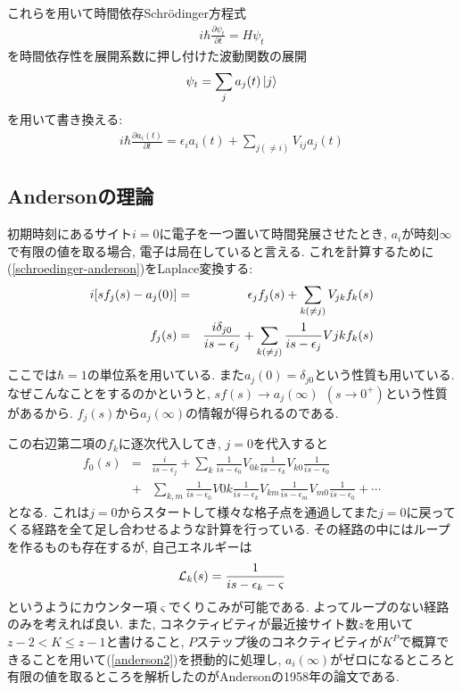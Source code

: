 \documentclass[10.5pt,a4paper]{jreport}
\begin{document}
これらを用いて時間依存Schr\"odinger方程式
\begin{eqnarray}
  i\hbar\frac{\partial \psi_t}{\partial t} = H\psi_t
\end{eqnarray}
を時間依存性を展開系数に押し付けた波動関数の展開
\begin{eqnarray}
  \psi_t = \sum_j a_j(t)\ket{j}
\end{eqnarray}
を用いて書き換える:
\begin{eqnarray}
  i\hbar\frac{\partial a_i(t)}{\partial t} = \epsilon_ia_i(t) + \sum_{j(\neq i)}V_{ij}a_j(t)\label{schroedinger-anderson}
\end{eqnarray}
\subsection{Andersonの理論}
初期時刻にあるサイト$i=0$に電子を一つ置いて時間発展させたとき, $a_i$が時刻$\infty$で有限の値を取る場合, 電子は局在していると言える. これを計算するために(\ref{schroedinger-anderson})をLaplace変換する:
\begin{eqnarray}
  i\qty[sf_j(s) - a_j(0)] &=& \epsilon_jf_j(s) + \sum_{k(\neq j)}V_{jk}f_k(s)\\
  f_j(s) &=& \frac{i\delta_{j0}}{is - \epsilon_j} + \sum_{k(\neq j)}\frac{1}{is - \epsilon_j}V{jk}f_k(s)
\end{eqnarray}
ここでは$\hbar = 1$の単位系を用いている. また$a_j(0) = \delta_{j0}$という性質も用いている. なぜこんなことをするのかというと, $sf(s)\rightarrow a_j(\infty)\ \ (s\rightarrow 0^+)$という性質があるから. $f_j(s)$から$a_j(\infty)$の情報が得られるのである.

この右辺第二項の$f_k$に逐次代入してき, $j = 0$を代入すると
\begin{eqnarray}
\nonumber  f_0(s) &=&  \frac{i}{is - \epsilon_j} + \sum_k\frac{1}{is - \epsilon_0}V_{0k}\frac{1}{is - \epsilon_k}V_{k0}\frac{1}{is - \epsilon_0}\\
  &+& \sum_{k, m} \frac{1}{is - \epsilon_0}V{0k}\frac{1}{is - \epsilon_k}V_{km}\frac{1}{is - \epsilon_m}V_{m0}\frac{1}{is - \epsilon_0} + \cdots \label{anderson2}
\end{eqnarray}
となる. これは$j = 0$からスタートして様々な格子点を通過してまた$j = 0$に戻ってくる経路を全て足し合わせるような計算を行っている. その経路の中にはループを作るものも存在するが, 自己エネルギーは
\begin{eqnarray}
  {\cal L}_k(s) = \frac{1}{is - \epsilon_k - \varsigma}
\end{eqnarray}
というようにカウンター項$\varsigma$でくりこみが可能である. よってループのない経路のみを考えれば良い. また, コネクティビティが最近接サイト数$z$を用いて$z-2 < K \leq z - 1$と書けること, $P$ステップ後のコネクティビティが$K^P$で概算できることを用いて(\ref{anderson2})を摂動的に処理し, $a_i(\infty)$がゼロになるところと有限の値を取るところを解析したのがAndersonの1958年の論文である.
\end{document}
